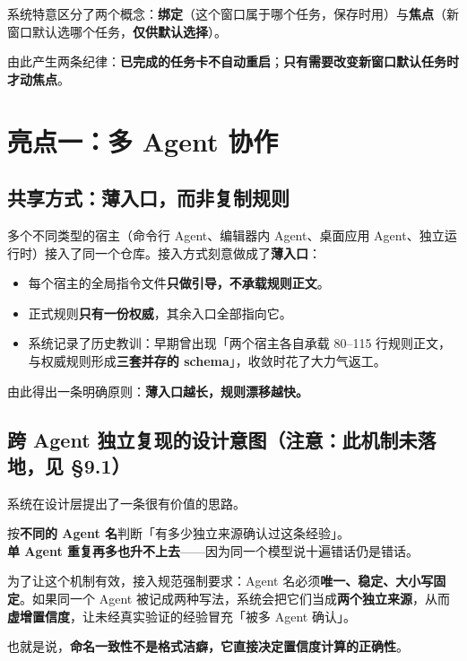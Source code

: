 \documentclass[11pt,a4paper]{ctexart}
\newcommand{\keybox}[1]{%
  \begin{center}%
  \begin{minipage}{0.94\linewidth}%
  \setlength{\fboxsep}{9pt}%
  \colorbox{SoftGray}{\parbox{\dimexpr\linewidth-2\fboxsep}{#1}}%
  \end{minipage}%
  \end{center}%
}
\begin{document}
系统特意区分了两个概念：\textbf{绑定}（这个窗口属于哪个任务，保存时用）与\textbf{焦点}（新窗口默认选哪个任务，\textbf{仅供默认选择}）。

由此产生两条纪律：\textbf{已完成的任务卡不自动重启}；\textbf{只有需要改变新窗口默认任务时才动焦点}。

\section{亮点一：多 Agent 协作}

\subsection{共享方式：薄入口，而非复制规则}

多个不同类型的宿主（命令行 Agent、编辑器内 Agent、桌面应用 Agent、独立运行时）接入了同一个仓库。接入方式刻意做成了\textbf{薄入口}：

\begin{itemize}
  \item 每个宿主的全局指令文件\textbf{只做引导，不承载规则正文}。
  \item 正式规则\textbf{只有一份权威}，其余入口全部指向它。
  \item 系统记录了历史教训：早期曾出现「两个宿主各自承载 80--115 行规则正文，与权威规则形成\textbf{三套并存的 schema}」，收敛时花了大力气返工。
\end{itemize}

由此得出一条明确原则：\textbf{薄入口越长，规则漂移越快。}

\subsection{跨 Agent 独立复现的设计意图（注意：此机制未落地，见 §9.1）}

系统在设计层提出了一条很有价值的思路。

\keybox{按\textbf{不同的 Agent 名}判断「有多少独立来源确认过这条经验」。\\[0.4em]
\textbf{单 Agent 重复再多也升不上去}——因为同一个模型说十遍错话仍是错话。}

为了让这个机制有效，接入规范强制要求：Agent 名必须\textbf{唯一、稳定、大小写固定}。如果同一个 Agent 被记成两种写法，系统会把它们当成\textbf{两个独立来源}，从而\textbf{虚增置信度}，让未经真实验证的经验冒充「被多 Agent 确认」。

也就是说，\textbf{命名一致性不是格式洁癖，它直接决定置信度计算的正确性}。
\end{document}
